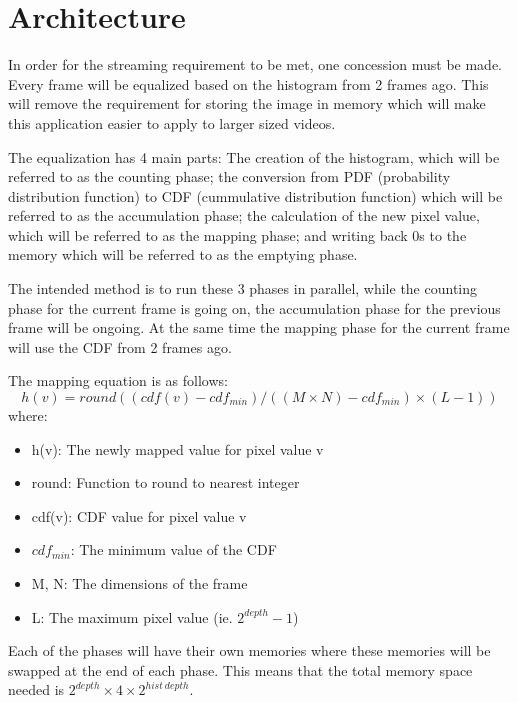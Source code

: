 \documentclass{article}
\begin{document}
    \section{Architecture}
        In order for the streaming requirement to be met, one concession must be made. Every frame will be equalized based on the histogram from 2 frames ago. This will remove the requirement for storing the image in memory which will make this application easier to apply to larger sized videos. 

    The equalization has 4 main parts: The creation of the histogram, which will be referred to as the counting phase; the conversion from PDF (probability distribution function) to CDF (cummulative distribution function) which will be referred to as the accumulation phase; the calculation of the new pixel value, which will be referred to as the mapping phase; and writing back 0s to the memory which will be referred to as the emptying phase. 

        The intended method is to run these 3 phases in parallel, while the counting phase for the current frame is going on, the accumulation phase for the previous frame will be ongoing. At the same time the mapping phase for the current frame will use the CDF from 2 frames ago. 

        The mapping equation is as follows:
        \[h(v)=round((cdf(v) - cdf_{min})/((M\times N)-cdf_{min})\times(L-1))\]
        where:
        \begin{itemize}
            \item h(v): The newly mapped value for pixel value v
            \item round: Function to round to nearest integer
            \item cdf(v): CDF value for pixel value v
            \item $cdf_{min}$: The minimum value of the CDF
            \item M, N: The dimensions of the frame
            \item L: The maximum pixel value (ie. $2^{depth}-1$)
        \end{itemize}

        Each of the phases will have their own memories where these memories will be swapped at the end of each phase. This means that the total memory space needed is $2^{depth}\times 4\times 2^{hist\ depth}$.
\end{document}
